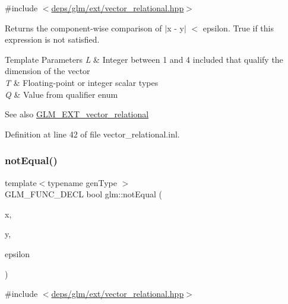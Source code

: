{\ttfamily \#include $<$\hyperlink{ext_2vector__relational_8hpp}{deps/glm/ext/vector\+\_\+relational.\+hpp}$>$}

Returns the component-\/wise comparison of $\vert$x -\/ y$\vert$ $<$ epsilon. True if this expression is not satisfied.


\begin{DoxyTemplParams}{Template Parameters}
{\em L} & Integer between 1 and 4 included that qualify the dimension of the vector \\
\hline
{\em T} & Floating-\/point or integer scalar types \\
\hline
{\em Q} & Value from qualifier enum\\
\hline
\end{DoxyTemplParams}
\begin{DoxySeeAlso}{See also}
\hyperlink{group__ext__vector__relational}{G\+L\+M\+\_\+\+E\+X\+T\+\_\+vector\+\_\+relational} 
\end{DoxySeeAlso}


Definition at line 42 of file vector\+\_\+relational.\+inl.

\mbox{\label{group__ext__vector__relational_ga27c5118811bcfed5504e50f22693373e}} 
\subsubsection{\texorpdfstring{not\+Equal()}{notEqual()}\hspace{0.1cm}{\footnotesize\ttfamily [3/3]}}
{\footnotesize\ttfamily template$<$typename gen\+Type $>$ \\
G\+L\+M\+\_\+\+F\+U\+N\+C\+\_\+\+D\+E\+CL bool glm\+::not\+Equal (\begin{DoxyParamCaption}\item[{gen\+Type const \&}]{x,  }\item[{gen\+Type const \&}]{y,  }\item[{gen\+Type const \&}]{epsilon }\end{DoxyParamCaption})}



{\ttfamily \#include $<$\hyperlink{ext_2vector__relational_8hpp}{deps/glm/ext/vector\+\_\+relational.\+hpp}$>$}

